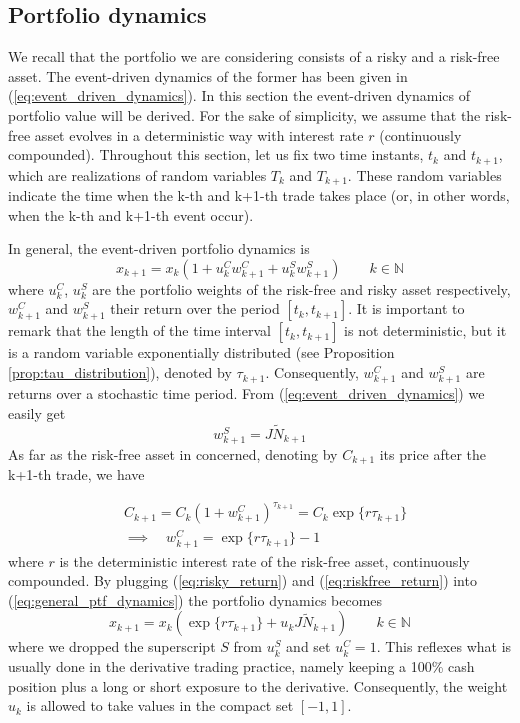 \subsection{Portfolio dynamics}
We recall that the portfolio we are considering consists of a risky and a risk-free asset. The event-driven dynamics of the former has been given in (\ref{eq:event_driven_dynamics}). In this section the event-driven dynamics of portfolio value will be derived. For the sake of simplicity, we assume that the risk-free asset evolves in a deterministic way with interest rate $r$ (continuously compounded). Throughout this section, let us fix two time instants, $t_k$ and $t_{k+1}$, which are realizations of random variables $T_k$ and $T_{k+1}$. These random variables indicate the time when the k-th and k+1-th trade takes place (or, in other words, when the k-th and k+1-th event occur).

In general, the event-driven portfolio dynamics is
\begin{equation}\label{eq:general_ptf_dynamics}
x_{k+1} = x_k(1+u_{k}^C w_{k+1}^{C} + u_{k}^S w_{k+1}^S) \qquad k \in \mathbb{N}
\end{equation}
where $u_{k}^C$, $u_{k}^S$ are the portfolio weights of the risk-free and risky asset respectively, $w_{k+1}^{C}$ and $w_{k+1}^S$ their return over the period $[t_k,t_{k+1}]$. It is important to remark that the length of the time interval $[t_k,t_{k+1}]$ is not deterministic, but it is a random variable exponentially distributed (see Proposition \ref{prop:tau_distribution}), denoted by $\tau_{k+1}$. Consequently, $w_{k+1}^{C}$ and $w_{k+1}^S$ are returns over a stochastic time period. From (\ref{eq:event_driven_dynamics}) we easily get
\begin{equation}\label{eq:risky_return}
w_{k+1}^S=J\widetilde{N}_{k+1}
\end{equation}
As far as the risk-free asset in concerned, denoting by $C_{k+1}$ its price after the k+1-th trade, we have

\begin{align}\label{eq:riskfree_return}
	\nonumber
	&C_{k+1} = C_k(1+w_{k+1}^{C})^{\tau_{k+1}} = C_k \exp\{r \tau_{k+1}\}\\
	& \implies \quad w_{k+1}^{C} = \exp\{r \tau_{k+1}\}-1
\end{align}
where $r$ is the deterministic interest rate of the risk-free asset, continuously compounded. By plugging (\ref{eq:risky_return}) and (\ref{eq:riskfree_return}) into (\ref{eq:general_ptf_dynamics}) the portfolio dynamics becomes
\begin{equation}\label{eq:ptf_dynamic_ED}
\boxed{x_{k+1}= x_k(\exp\{r\tau_{k+1}\} + u_{k}J\widetilde{N}_{k+1} ) } \qquad k \in \mathbb{N}
\end{equation}	
where we dropped the superscript $S$ from $u_{k}^S$ and set $u_k^C=1$. This reflexes what is usually done in the derivative trading practice, namely keeping a 100\% cash position plus a long or short exposure to the derivative. Consequently, the weight $u_{k}$ is allowed to take values in the compact set $[-1,1]$. 

